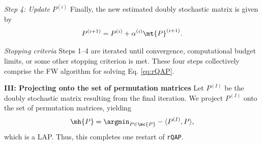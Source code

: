\documentclass[10pt,journal,cspaper,compsoc]{IEEEtran}
\newcommand{\PmcP}{P \in \mc{P}}
\begin{document}
\emph{Step 4: Update $P^{(i)}$} Finally, the new estimated doubly stochastic matrix is given by
\begin{align}\label{eq:update}
	P^{(i+1)} = P^{(i)} + \alpha^{(i)} \mt{P}^{(i+1)}.
\end{align}


\emph{Stopping criteria} Steps 1--4 are iterated until convergence, computational budget limits, or some other stopping criterion is met.  These four steps collectively comprise the FW algorithm for solving Eq. \eqref{eq:rQAP}.  %


\textbf{III: Projecting onto the set of permutation matrices}   Let $P^{(I)}$ be the doubly stochastic matrix resulting from the final iteration.  We project $P^{(I)}$ onto the set of permutation matrices, yielding
\begin{align} \label{eq:proj}
	\mh{P} = \argmin_{\PmcP} -\langle P^{(I)}, P \rangle,
\end{align}
which is a LAP.  Thus, this completes one restart of \texttt{rQAP}.




% 
\end{document}
